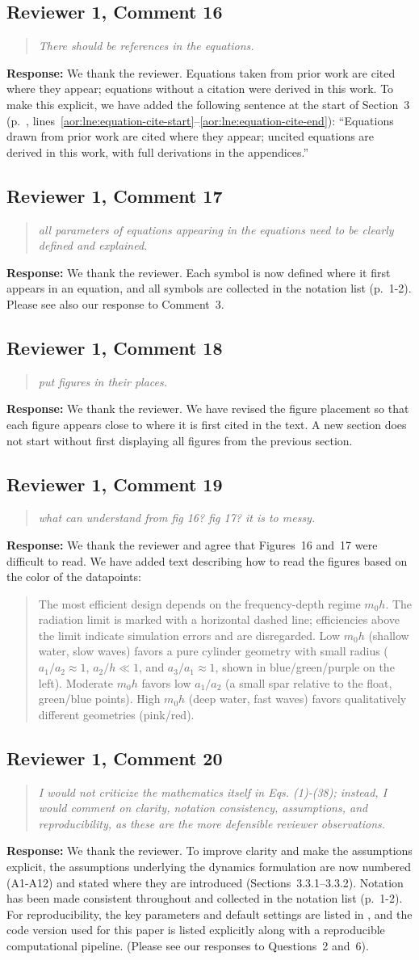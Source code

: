 \documentclass[11pt]{article}
\newcommand{\rcomment}[2]{\subsection*{#1}\begin{quote}\itshape #2\end{quote}}
\newcommand{\response}{\noindent\textbf{Response:} }
\begin{document}
\rcomment{Reviewer 1, Comment 16}{There should be references in the equations.}
\response We thank the reviewer. Equations taken from prior work are cited where they appear; equations without a citation were derived in this work.
To make this explicit, we have added the following sentence at the start of Section~3
(p.~\pageref{aor:lne:equation-cite-start}, lines~\ref{aor:lne:equation-cite-start}--\ref{aor:lne:equation-cite-end}):
``Equations drawn from prior work are cited where they appear;
uncited equations are derived in this work, with full derivations in the appendices.''

\rcomment{Reviewer 1, Comment 17}{all parameters of equations appearing in the equations need to be clearly defined and explained.}
\response We thank the reviewer.
Each symbol is now defined where it first appears in an equation,
and all symbols are collected in the notation list (p.~1-2).
Please see also our response to Comment~3.

\rcomment{Reviewer 1, Comment 18}{put figures in their places.}
\response We thank the reviewer. 
We have revised the figure placement so that each figure appears close to where it is first cited in the text.
A new section does not start without first displaying all figures from the previous section.

\rcomment{Reviewer 1, Comment 19}{what can understand from fig 16? fig 17? it is to messy.}
\response We thank the reviewer and agree that Figures~16 and~17 were difficult to read. We have added text describing how to read the figures based on the color of the datapoints:
\begin{quote}
The most efficient design depends on the frequency-depth regime $m_0h$.
    The radiation limit is marked with a horizontal dashed line; efficiencies above the limit indicate simulation errors and are disregarded.
    Low $m_0h$ (shallow water, slow waves) favors a pure cylinder geometry with small radius ($a_1/a_2 \approx 1$, $a_2/h \ll 1$, and $a_3/a_1\approx 1$, shown in blue/green/purple on the left).
    Moderate $m_0h$ favors low $a_1/a_2$ (a small spar relative to the float, green/blue points).
    High $m_0h$ (deep water, fast waves) favors qualitatively different geometries (pink/red).
\end{quote}

\rcomment{Reviewer 1, Comment 20}{I would not criticize the mathematics itself in Eqs. (1)-(38); instead, I would comment on clarity, notation consistency, assumptions, and reproducibility, as these are the more defensible reviewer observations.}
\response We thank the reviewer. To improve clarity and make the assumptions explicit, the assumptions underlying the dynamics formulation are now numbered (A1-A12) and stated where they are introduced (Sections~3.3.1--3.3.2).
Notation has been made consistent throughout and collected in the notation list (p.~1-2). For reproducibility, the key parameters and default settings are listed in ,
and the code version used for this paper is listed explicitly along with a reproducible computational pipeline.
(Please see our responses to Questions~2 and~6).
\end{document}
